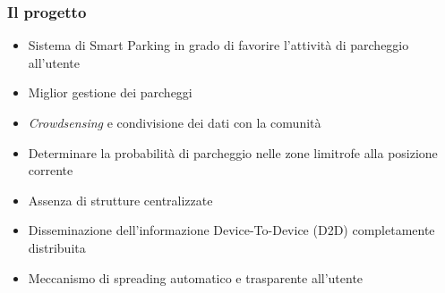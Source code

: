 \documentclass{beamer}
\begin{document}
\begin{frame}
  \frametitle{Il progetto}
  \begin{itemize}
    \item Sistema di Smart Parking in grado di favorire l'attività di parcheggio all'utente 
    \item Miglior gestione dei parcheggi 
    \item \textit{Crowdsensing} e condivisione dei dati con la comunità
    \item Determinare la probabilità di parcheggio nelle zone limitrofe alla posizione corrente
    \item Assenza di strutture centralizzate
    \item Disseminazione dell'informazione Device-To-Device (D2D) completamente distribuita
    \item Meccanismo di spreading automatico e trasparente all'utente
  \end{itemize}
\end{frame}
\end{document}
